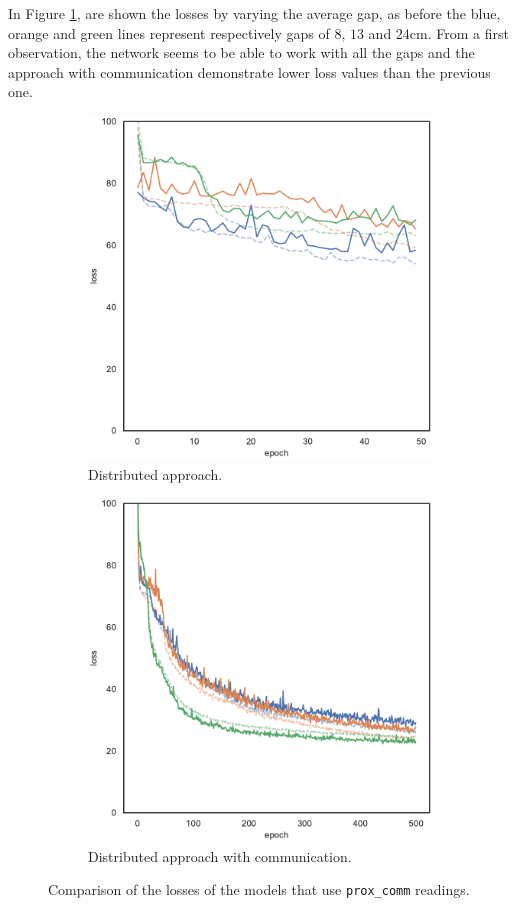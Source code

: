 In Figure \ref{fig:commlossprox_comm}, are shown the losses by varying the 
average gap, as before the blue, orange and green lines represent respectively 
gaps of $8$, $13$ and $24$\gls{cm}. From a first observation, the network seems 
to be able to work with all the gaps and the approach with communication 
demonstrate lower loss values than the previous one.
\begin{figure}[!htb]
	\begin{center}
		\begin{subfigure}[h]{0.49\textwidth}
			\centering
			\includegraphics[width=.7\textwidth]{contents/images/task1-comm/loss-distributed-prox_comm@copy}
			\caption{Distributed approach.}
		\end{subfigure}
		\hfill
		\begin{subfigure}[h]{0.49\textwidth}
			\centering
			\includegraphics[width=.7\textwidth]{contents/images/task1-comm/loss-communication-prox_comm@copy}
			\caption{Distributed approach with communication.}
		\end{subfigure}	
	\end{center}
	\vspace{-0.5cm}
	\caption{Comparison of the losses of the models that use \texttt{prox\_comm} 
		readings.}
	\label{fig:commlossprox_comm}
\end{figure}

